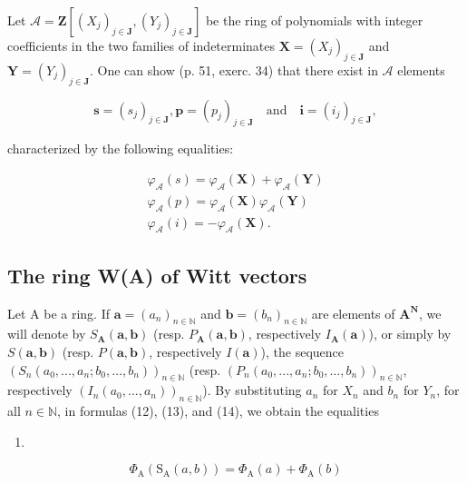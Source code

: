 Let \(\mathcal{A} = \mathbf{Z}[(X_j)_{j\in\mathbf{J}},(Y_j)_{j\in\mathbf{J}}]\) be the ring of polynomials with integer coefficients in the two families of indeterminates \(\mathbf{X} = (X_j)_{j\in\mathbf{J}}\) and \(\mathbf{Y} = (Y_j)_{j\in\mathbf{J}}\). One can show (p. 51, exerc. 34) that there exist in \(\mathcal{A}\) elements

\[
\boldsymbol {s} = (s _ {j}) _ {j \in \mathbf {J}}, \boldsymbol {p} = (p _ {j}) _ {j \in \mathbf {J}} \quad \text{and} \quad \boldsymbol {i} = (i _ {j}) _ {j \in \mathbf {J}},
\]

characterized by the following equalities:

\[
\begin{array}{l} \varphi_ {\mathcal {A}} (s) = \varphi_ {\mathcal {A}} (\mathbf {X}) + \varphi_ {\mathcal {A}} (\mathbf {Y}) \\ \varphi_ {\mathcal {A}} (p) = \varphi_ {\mathcal {A}} (\mathbf {X}) \varphi_ {\mathcal {A}} (\mathbf {Y}) \\ \varphi_ {\mathcal {A}} (i) = - \varphi_ {\mathcal {A}} (\mathbf {X}). \end{array}
\]

\subsection{The ring W(A) of Witt vectors}

Let A be a ring. If \(\boldsymbol{a} = (a_n)_{n \in \mathbb{N}}\) and \(\boldsymbol{b} = (b_n)_{n \in \mathbb{N}}\) are elements of \(\mathbf{A}^{\mathbf{N}}\), we will denote by \(S_{\mathbf{A}}(\boldsymbol{a}, \boldsymbol{b})\) (resp. \(P_{\mathbf{A}}(\boldsymbol{a}, \boldsymbol{b})\), respectively \(I_{\mathbf{A}}(\boldsymbol{a})\)), or simply by \(S(\boldsymbol{a}, \boldsymbol{b})\) (resp. \(P(\boldsymbol{a}, \boldsymbol{b})\), respectively \(I(\boldsymbol{a})\)), the sequence \((S_n(a_0, ..., a_n; b_0, \ldots, b_n))_{n \in \mathbb{N}}\) (resp. \((P_n(a_0, ..., a_n; b_0, \ldots, b_n))_{n \in \mathbb{N}}\), respectively \((I_n(a_0, ..., a_n))_{n \in \mathbb{N}}\)). By substituting \(a_n\) for \(X_n\) and \(b_n\) for \(Y_n\), for all \(n \in \mathbb{N}\), in formulas (12), (13), and (14), we obtain the equalities

\begin{enumerate}
\def\labelenumi{(\arabic{enumi})}
\setcounter{enumi}{15}
\tightlist
\item
\end{enumerate}

\[
\Phi_ {\mathrm{A}} (\mathrm{S} _ {\mathrm{A}} (a, b)) = \Phi_ {\mathrm{A}} (a) + \Phi_ {\mathrm{A}} (b)\tag{17}
\]

